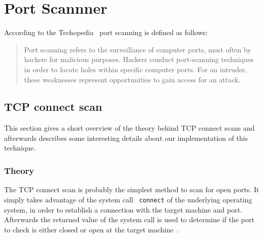 \chapter{Port Scannner}
According to the Techopedia~\cite{techopedia} port scanning is defined as follows:
\begin{quote}
	Port scanning refers to the surveillance of computer ports, most often by hackers for malicious purposes. Hackers conduct port-scanning techniques in order to locate holes within specific computer ports. For an intruder, these weaknesses represent opportunities to gain access for an attack. 
\end{quote}

\section{TCP connect scan}
This section gives a short overview of the theory behind TCP connect scans and afterwards describes some interesting details about our implementation
of this technique. 
\label{sec:connect}
\subsection{Theory}
The TCP connect scan is probably the simplest method to scan for open ports. It simply takes advantage of the system call
~\lstinline|connect| of the underlying operating system, in order to establish a connection with the target machine and port. Afterwards the
returned value of the system call is used to determine if the port to check is either closed or open at the target machine~\cite{nmap2009}.


